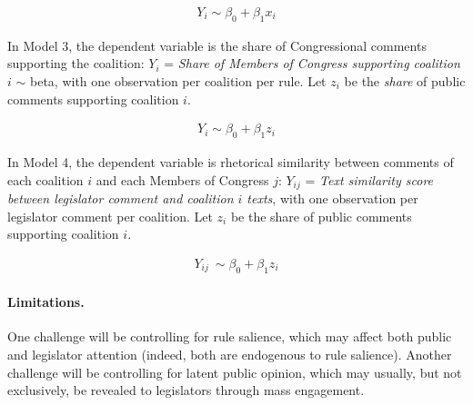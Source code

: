 \begin{align}
    Y_i \sim \beta_0 + \beta_1 x_i
\end{align}

In Model 3, the dependent variable is the share of Congressional comments supporting the coalition: $Y_i$ = \textit{Share of Members of Congress supporting coalition $i$} $\sim$  beta, with one observation per coalition per rule. Let $z_i$ be the \textit{share} of public comments supporting coalition $i$.

\begin{align}
    Y_i \sim \beta_0 + \beta_1 z_i
\end{align}

In Model 4, the dependent variable is rhetorical similarity between comments of each coalition $i$ and each Members of Congress $j$: $Y_{ij}$ = \textit{Text similarity score between legislator comment and coalition $i$ texts}, with one observation per legislator comment per coalition. Let $z_i$ be the share of public comments supporting coalition $i$.

\begin{align}
    Y_{ij} ~ \sim \beta_0 + \beta_1 z_i
\end{align}


\paragraph{Limitations.} One challenge will be controlling for rule salience, which may affect both public and legislator attention (indeed, both are endogenous to rule salience). Another challenge will be controlling for latent public opinion, which may usually, but not exclusively, be revealed to legislators through mass engagement.%



